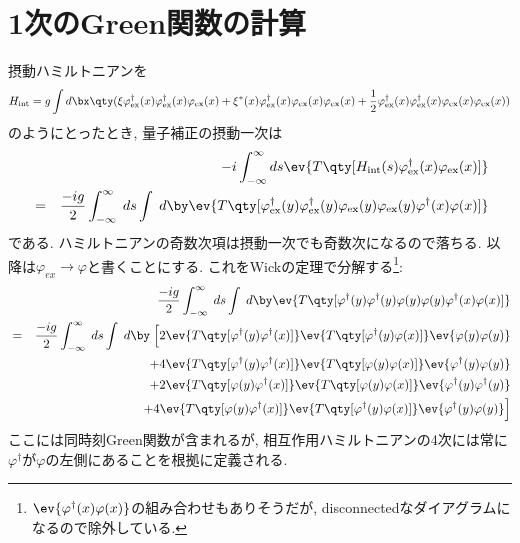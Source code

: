 \documentclass[10.5pt,a4paper]{jreport}
\begin{document}
\section{1次のGreen関数の計算}
摂動ハミルトニアンを
\begin{eqnarray}
  H_{\rm int} = g\int d\bx \qty(\xi \varphi_{\rm ex}^\dagger(x)\varphi_{\rm ex}^\dagger(x)\varphi_{\rm ex}(x) + \xi^*(x)\varphi_{\rm ex}^\dagger(x)\varphi_{\rm ex}(x)\varphi_{\rm ex}(x) + \frac12\varphi_{\rm ex}^\dagger(x)\varphi_{\rm ex}^\dagger(x)\varphi_{\rm ex}(x)\varphi_{\rm ex}(x))
\end{eqnarray}
のようにとったとき, 量子補正の摂動一次は
\begin{eqnarray}
  &&-i\int_{-\infty}^{\infty} ds\ev{T\qty[H_{\rm int}(s)\varphi^\dagger_{\rm ex}(x)\varphi_{\rm ex}(x)]}\\
  &=& \frac{-ig}{2}\int_{-\infty}^{\infty}\; ds\int\; d\by \ev{T\qty[\varphi_{\rm ex}^\dagger(y)\varphi_{\rm ex}^\dagger(y)\varphi_{\rm ex}(y)\varphi_{\rm ex}(y)\varphi^\dagger(x)\varphi(x)]}
\end{eqnarray}
である. ハミルトニアンの奇数次項は摂動一次でも奇数次になるので落ちる. 以降は$\varphi_{ex}\rightarrow \varphi$と書くことにする. これをWickの定理で分解する\footnote{$\ev{\varphi^\dagger(x)\varphi(x)}$の組み合わせもありそうだが, disconnectedなダイアグラムになるので除外している. }:
\begin{eqnarray}
  &&\frac{-ig}{2}\int_{-\infty}^{\infty}\; ds\int\; d\by \ev{T\qty[\varphi^\dagger(y)\varphi^\dagger(y)\varphi(y)\varphi(y)\varphi^\dagger(x)\varphi(x)]}\\
  \nonumber  &=& \frac{-ig}{2}\int_{-\infty}^{\infty}\; ds\int\; d\by\; \Bigl[2\ev{T\qty[\varphi^\dagger(y)\varphi^\dagger(x)]}\ev{T\qty[\varphi^\dagger(y)\varphi(x)]}\ev{\varphi(y)\varphi(y)}\\
    \nonumber    &&\hspace{3cm}+4\ev{T\qty[\varphi^\dagger(y)\varphi^\dagger(x)]}\ev{T\qty[\varphi(y)\varphi(x)]}\ev{\varphi^\dagger(y)\varphi(y)}\\
    \nonumber&&\hspace{3cm}+2\ev{T\qty[\varphi(y)\varphi^\dagger(x)]}\ev{T\qty[\varphi(y)\varphi(x)]}\ev{\varphi^\dagger(y)\varphi^\dagger(y)}\\
    &&\hspace{3cm}+ 4\ev{T\qty[\varphi(y)\varphi^\dagger(x)]}\ev{T\qty[\varphi^\dagger(y)\varphi(x)]}\ev{\varphi^\dagger(y)\varphi(y)}\Bigr]\label{Green_1st}
\end{eqnarray}
ここには同時刻Green関数が含まれるが, 相互作用ハミルトニアンの4次には常に$\varphi^\dagger$が$\varphi$の左側にあることを根拠に定義される. 
\end{document}
